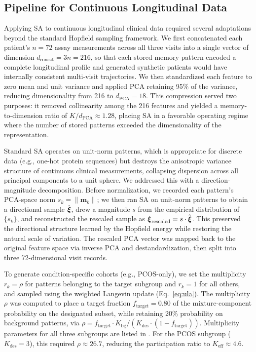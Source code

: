 \subsection{Pipeline for Continuous Longitudinal Data}
\label{sec:pipeline}

Applying SA to continuous longitudinal clinical data required several adaptations
beyond the standard Hopfield sampling framework. We first concatenated each patient's
$n{=}72$ assay measurements across all three visits into a single vector of dimension
$d_{\text{concat}} = 3n = 216$, so that each stored memory pattern encoded a
complete longitudinal profile and generated synthetic patients would have internally
consistent multi-visit trajectories. We then standardized each feature to zero mean
and unit variance and applied PCA retaining 95\% of the variance, reducing
dimensionality from 216 to $d_{\text{PCA}}{=}18$. This compression served two
purposes: it removed collinearity among the 216 features and yielded a
memory-to-dimension ratio of $K/d_{\text{PCA}} \approx 1.28$, placing SA in a
favorable operating regime where the number of stored patterns exceeded the
dimensionality of the representation.

Standard SA operates on unit-norm patterns, which is appropriate for discrete data
(e.g., one-hot protein sequences) but destroys the anisotropic variance structure
of continuous clinical measurements, collapsing dispersion across all principal
components to a unit sphere. We addressed this with a direction-magnitude
decomposition. Before normalization, we recorded each pattern's PCA-space norm
$s_k = \|\mathbf{m}_k\|$; we then ran SA on unit-norm patterns to obtain a
directional sample $\hat{\boldsymbol{\xi}}$, drew a magnitude $s$ from the empirical
distribution of $\{s_k\}$, and reconstructed the rescaled sample as
$\boldsymbol{\xi}_{\text{rescaled}} = s \cdot \hat{\boldsymbol{\xi}}$. This preserved the directional
structure learned by the Hopfield energy while restoring the natural scale of
variation. The rescaled PCA vector was mapped back to the original feature space via
inverse PCA and destandardization, then split into three 72-dimensional visit records.

To generate condition-specific cohorts (e.g., PCOS-only), we set the multiplicity
$r_k = \rho$ for patterns belonging to the target subgroup and $r_k = 1$ for all
others, and sampled using the weighted Langevin update (Eq.~\ref{eq:ula}). The
multiplicity $\rho$ was computed to place a target fraction
$f_{\text{target}} = 0.80$ of the mixture-component probability on the designated subset,
while retaining 20\% probability on background patterns, via
$\rho = f_{\text{target}} \cdot K_{\text{bg}} / (K_{\text{des}} \cdot (1 -
f_{\text{target}}))$. Multiplicity parameters for all three subgroups are
listed in . For the PCOS subgroup
($K_{\text{des}}{=}3$), this required $\rho \approx 26.7$, reducing the
participation ratio to $K_{\text{eff}} \approx 4.6$. 


